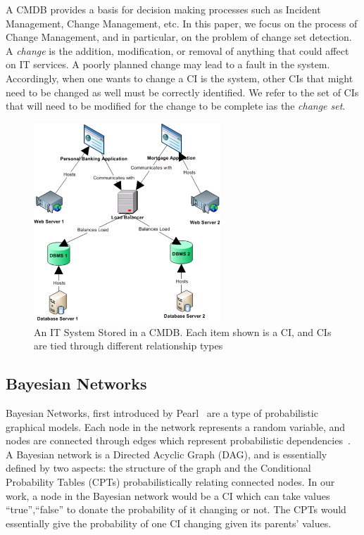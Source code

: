 \documentclass[10pt,twocolumn,letterpaper]{article}
\begin{document}
A CMDB provides a basis for decision making processes such as Incident Management, Change Management, etc.  In this paper, we focus on the process of Change
Management, and in particular, on the problem of change set detection. A \textit{change} is the addition, modification, or removal of anything that could affect
on IT services. A poorly planned change may lead to a fault in the system. Accordingly, when one wants to change a CI is the system, other CIs that might
need to be changed as well must be correctly identified. We refer to the set of CIs that will need to be modified for the change to be complete ias the
\textit{change set}.

\begin{figure}[!t]
\centering
\includegraphics[width=7cm]{cmdbExample.PNG}
\caption{An IT System Stored in a CMDB. Each item shown is a CI, and CIs are tied through different relationship types}
\label{fig:cmdbExample}
\end{figure}

\subsection{Bayesian Networks}

Bayesian Networks, first introduced by Pearl~\cite{pearl1988probabilistic} are a type of probabilistic graphical models. Each node in the network
represents a random
variable, and nodes are connected through edges which represent probabilistic dependencies~\cite{benbayesian}. A Bayesian network is a Directed
Acyclic Graph (DAG), and is essentially defined by two aspects: the structure of the graph and the Conditional Probability Tables (CPTs) probabilistically
relating connected nodes. In our work, a node in the Bayesian network would be a CI which can take values {``true'',``false''} to donate the probability of it
changing or not. The CPTs would essentially give the probability of one CI changing given its parents' values.
\end{document}
